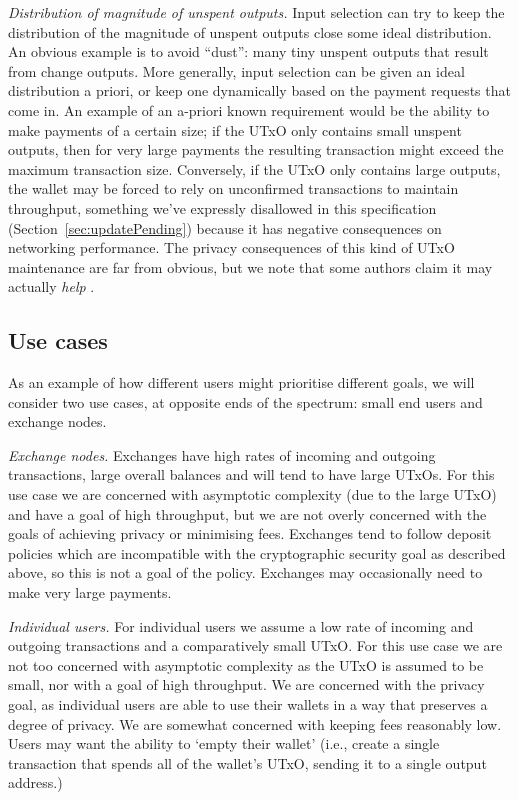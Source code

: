\documentclass{article}
\numberwithin{equation}{lemma}
\begin{document}
\emph{Distribution of magnitude of unspent outputs.}
Input selection can try to keep the distribution of the magnitude of unspent
outputs close some ideal distribution. An obvious example is to avoid ``dust'':
many tiny unspent outputs that result from change outputs. More generally,
input selection can be given an ideal distribution a priori, or keep one
dynamically based on the payment requests that come in. An example of an
a-priori known requirement would be the ability to make payments of a certain
size; if the UTxO only contains small unspent outputs, then for very large
payments the resulting transaction might exceed the maximum transaction size.
Conversely, if the UTxO only contains large outputs, the wallet may be forced to
rely on unconfirmed transactions to maintain throughput, something we've
expressly disallowed in this specification (Section~\ref{sec:updatePending})
because it has negative consequences on networking performance.
The privacy consequences of this kind of UTxO maintenance are far from obvious,
but we note that some authors claim it may actually \emph{help}
\citep[Section 2]{10.1007/978-3-642-39884-1_2}.

\subsection{Use cases}
\label{sec:input_selection_use_cases}

As an example of how different users might prioritise different goals,
we will consider two use cases, at opposite ends of the spectrum: small end
users and exchange nodes.

\emph{Exchange nodes.}
Exchanges have high rates of incoming and outgoing transactions, large overall
balances and will tend to have large UTxOs. For this use case we are concerned
with asymptotic complexity (due to the large UTxO) and have a goal of high
throughput, but we are not overly concerned with the goals of achieving privacy
or minimising fees. Exchanges tend to follow deposit policies which are
incompatible with the cryptographic security goal as described above, so this is
not a goal of the policy. Exchanges may occasionally need to make very large
payments.

\emph{Individual users.}
For individual users we assume a low rate of incoming and outgoing transactions
and a comparatively small UTxO. For this use case we are not too concerned with
asymptotic complexity as the UTxO is assumed to be small, nor with a goal of
high throughput. We are concerned with the privacy goal, as individual users
are able to use their wallets in a way that preserves a degree of privacy. We
are somewhat concerned with keeping fees reasonably low. Users may want the
ability to `empty their wallet' (i.e., create a single transaction that
spends all of the wallet's UTxO, sending it to a single output address.)
\end{document}
